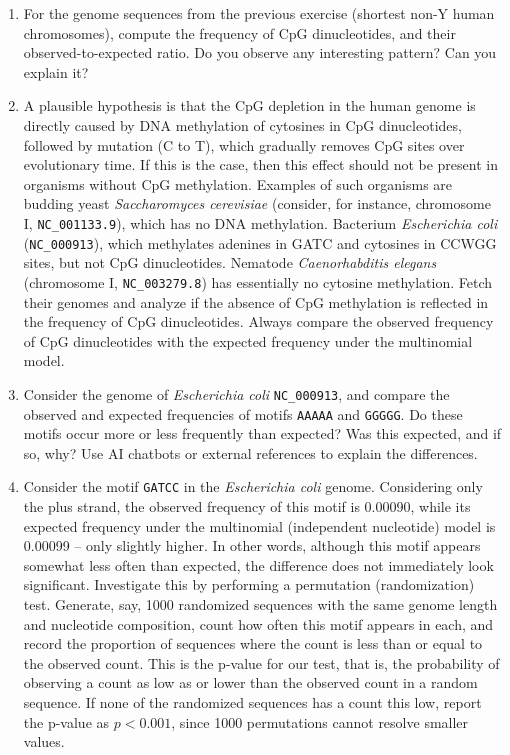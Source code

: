 \begin{enumerate}
\item For the genome sequences from the previous exercise (shortest non-Y human chromosomes), compute the frequency of CpG dinucleotides, and their observed-to-expected ratio. Do you observe any interesting pattern? Can you explain it?

\item A plausible hypothesis is that the CpG depletion in the human genome is directly caused by DNA methylation of cytosines in CpG dinucleotides, followed by mutation (C to T), which gradually removes CpG sites over evolutionary time. If this is the case, then this effect should not be present in organisms without CpG methylation. Examples of such organisms are budding yeast \textit{Saccharomyces cerevisiae} (consider, for instance, chromosome I, \texttt{NC\_001133.9}), which has no DNA methylation. Bacterium \textit{Escherichia coli} (\texttt{NC\_000913}), which methylates adenines in GATC and cytosines in CCWGG sites, but not CpG dinucleotides. Nematode \textit{Caenorhabditis elegans} (chromosome I, \texttt{NC\_003279.8}) has essentially no cytosine methylation. Fetch their genomes and analyze if the absence of CpG methylation is reflected in the frequency of CpG dinucleotides. Always compare the observed frequency of CpG dinucleotides with the expected frequency under the multinomial model.

\item Consider the genome of \textit{Escherichia coli} \texttt{NC\_000913}, and compare the observed and expected frequencies of motifs \texttt{AAAAA} and \texttt{GGGGG}. Do these motifs occur more or less frequently than expected? Was this expected, and if so, why? Use AI chatbots or external references to explain the differences.

\item Consider the motif \texttt{GATCC} in the \textit{Escherichia coli} genome. Considering only the plus strand, the observed frequency of this motif is 0.00090, while its expected frequency under the multinomial (independent nucleotide) model is 0.00099 – only slightly higher. In other words, although this motif appears somewhat less often than expected, the difference does not immediately look significant. Investigate this by performing a permutation (randomization) test. Generate, say, 1000 randomized sequences with the same genome length and nucleotide composition, count how often this motif appears in each, and record the proportion of sequences where the count is less than or equal to the observed count. This is the p-value for our test, that is, the probability of observing a count as low as or lower than the observed count in a random sequence. If none of the randomized sequences has a count this low, report the p-value as $p < 0.001$, since 1000 permutations cannot resolve smaller values.
\end{enumerate}
